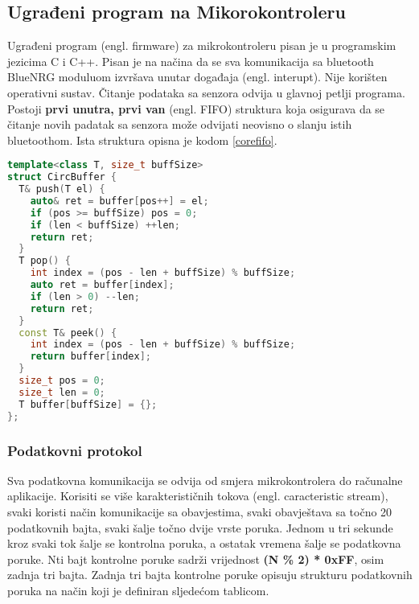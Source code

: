 \documentclass[times, utf8, diplomski]{diplomski}
\begin{document}
\subsection{Ugrađeni program na Mikorokontroleru}
Ugrađeni program (engl. firmware) za mikrokontroleru pisan je u programskim jezicima C i C++. Pisan je na načina da se sva komunikacija sa bluetooth BlueNRG moduluom izvršava unutar događaja (engl. interupt). Nije korišten operativni sustav. Čitanje podataka sa senzora odvija u glavnoj petlji programa. Postoji \textbf{prvi unutra, prvi van} (engl. FIFO) struktura koja osigurava da se čitanje novih padatak sa senzora može odvijati neovisno o slanju istih bluetoothom. Ista struktura opisna je kodom \ref{corefifo}.

\begin{lstlisting}[language=c++, caption={FIFO struktura koja omgučuje neovisan dohvat novih podataka i slanje najstarijih}, label={codefifo}]
template<class T, size_t buffSize>
struct CircBuffer {
  T& push(T el) {
    auto& ret = buffer[pos++] = el;
    if (pos >= buffSize) pos = 0;
    if (len < buffSize) ++len;
    return ret;
  }
  T pop() {
    int index = (pos - len + buffSize) % buffSize;
    auto ret = buffer[index];
    if (len > 0) --len;
    return ret;
  }
  const T& peek() {
    int index = (pos - len + buffSize) % buffSize;
    return buffer[index];
  }
  size_t pos = 0;
  size_t len = 0;
  T buffer[buffSize] = {};
};
\end{lstlisting}

\subsubsection{Podatkovni protokol}
Sva podatkovna komunikacija se odvija od smjera mikrokontrolera do računalne aplikacije. Korisiti se više karakterističnih tokova (engl. caracteristic stream), svaki koristi način komunikacije sa obavjestima, svaki obavještava sa točno 20 podatkovnih bajta, svaki šalje točno dvije vrste poruka. Jednom u tri sekunde kroz svaki tok šalje se kontrolna poruka, a ostatak vremena šalje se podatkovna poruke. Nti bajt kontrolne poruke sadrži vrijednost \textbf{(N \% 2) * 0xFF}, osim zadnja tri bajta. Zadnja tri bajta kontrolne poruke opisuju strukturu podatkovnih poruka na način koji je definiran sljedećom tablicom.
\newpage{}
\end{document}
